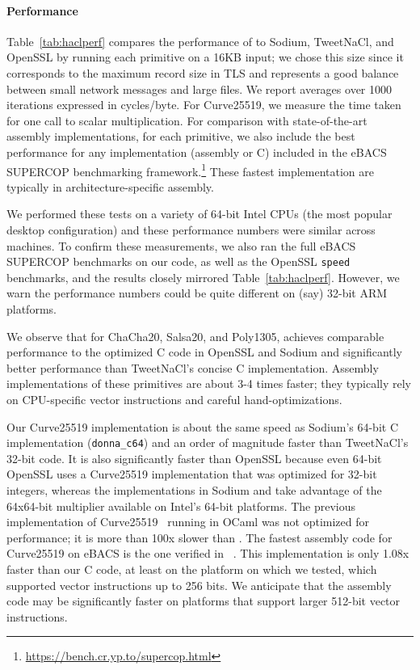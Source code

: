\documentclass[acmsmall,review,anonymous]{acmart}\settopmatter{printfolios=true}
\begin{document}
\paragraph*{Performance}
%
Table~\ref{tab:haclperf} compares the performance of \haclstar to Sodium, TweetNaCl,
and OpenSSL by running each primitive on a 16KB input; we chose this size since it
corresponds to the maximum record size in TLS and represents a good balance
between small network messages and large files. 
%
We report averages over 1000 iterations expressed in cycles/byte.
%
For Curve25519, we measure the time taken for one call to scalar multiplication.
%
For comparison with state-of-the-art assembly implementations, for each primitive,
we also include the best performance for any implementation (assembly or C)
included in the eBACS SUPERCOP benchmarking framework.\footnote{\url{https://bench.cr.yp.to/supercop.html}} 
%
These fastest implementation are typically in architecture-specific assembly.

We performed these tests on a variety of 64-bit Intel CPUs (the most
popular desktop configuration) and these performance numbers were
similar across machines. To confirm these measurements, we also ran
the full eBACS SUPERCOP benchmarks on our code, as well as the OpenSSL
\texttt{speed} benchmarks, and the results closely mirrored
Table~\ref{tab:haclperf}. However, we warn the performance numbers 
could be quite different on (say) 32-bit ARM platforms.

We observe that for ChaCha20, Salsa20, and Poly1305, \haclstar achieves comparable performance 
to the optimized C code in OpenSSL and Sodium and significantly better performance than 
TweetNaCl's concise C implementation.
%
Assembly implementations of these primitives are about 3-4 times faster; they typically
rely on CPU-specific vector instructions and careful hand-optimizations.

Our Curve25519 implementation is about the same speed as Sodium's
64-bit C implementation (\texttt{donna\_c64}) and an order of magnitude
faster than TweetNaCl's 32-bit code.  It is also significantly faster
than OpenSSL because even 64-bit OpenSSL uses a Curve25519 implementation 
that was optimized for 32-bit integers, whereas the implementations in 
Sodium and \haclstar take advantage of the 64x64-bit multiplier available 
on Intel's 64-bit platforms.
%
The previous \fstar implementation of Curve25519~\cite{ZBB16} 
running in OCaml was not optimized for performance; it
is more than 100x slower than \haclstar.
%
The fastest assembly code for Curve25519 on eBACS is the one verified
in ~\cite{chen2014verifying}. This implementation is only 1.08x faster
than our C code, at least on the platform on which we tested, which
supported vector instructions up to 256 bits.  We anticipate that the
assembly code may be significantly faster on platforms that support
larger 512-bit vector instructions.
%
\end{document}
